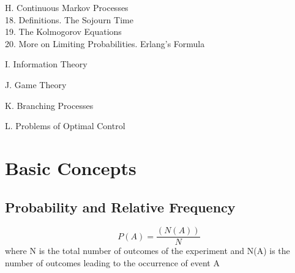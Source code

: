\documentclass{pset}
\theoremstyle{definition}\newtheorem*{defn}{Definition}
\theoremstyle{definition}\newtheorem*{eg}{Example}
\theoremstyle{theorem}\newtheorem{prop}{Proposition}
\theoremstyle{definition}\newtheorem{ex}{Exercise}
\theoremstyle{definition}\newtheorem*{question}{Question}
\theoremstyle{definition}\newtheorem*{answer}{Answer}
\theoremstyle{definition}\newtheorem*{oproblem}{Open Problem}
\theoremstyle{theorem}\newtheorem{thm}{Theorem}
\theoremstyle{theorem}\newtheorem{lemma}{Lemma}
\theoremstyle{definition}\newtheorem*{remark}{Remark}
\theoremstyle{definition}\newtheorem*{observation}{Observation}
\theoremstyle{definition}\newtheorem*{aside}{Aside}
\theoremstyle{definition}\newtheorem*{hint}{Hint}
\theoremstyle{theorem}\newtheorem*{cor}{Corollary}
\begin{document}
H. {Continuous Markov Processes}
\\ 18.  Definitions.  The Sojourn Time
\\ 19.  The Kolmogorov Equations
\\ 20.  More on Limiting Probabilities.  Erlang's Formula

I. {Information Theory}

J. {Game Theory}

K. {Branching Processes}

L. {Problems of Optimal Control}

\clearpage

\section{ Basic Concepts }

\subsection {Probability and Relative Frequency}

\begin{equation}
P(A) = \frac{(N(A))}{N}
\end{equation}
where N is the total number of outcomes of the experiment and N(A) is the number of outcomes leading to the occurrence of event A
\end{document}
